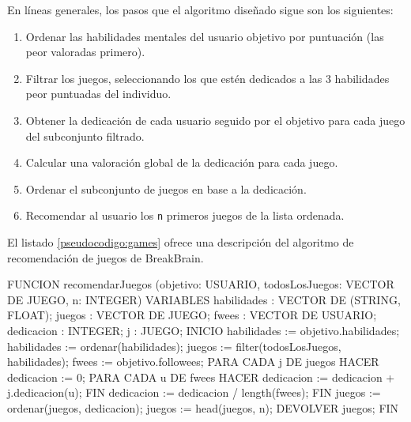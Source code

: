 En líneas generales, los pasos que el algoritmo diseñado sigue son los siguientes:

\begin{enumerate}
\item Ordenar las habilidades mentales del usuario objetivo por puntuación (las peor valoradas primero).
\item Filtrar los juegos, seleccionando los que estén dedicados a las 3 habilidades peor puntuadas del individuo.
\item Obtener la dedicación de cada usuario seguido por el objetivo para cada juego del subconjunto filtrado.
\item Calcular una valoración global de la dedicación para cada juego.
\item Ordenar el subconjunto de juegos en base a la dedicación.
\item Recomendar al usuario los {\tt n} primeros juegos de la lista ordenada.
\end{enumerate}

El listado \ref{pseudocodigo:games} ofrece una descripción del algoritmo de recomendación de juegos de BreakBrain.

\begin{listing}[caption=Algoritmo de recomendación de juegos, label=pseudocodigo:games]
FUNCION recomendarJuegos (objetivo: USUARIO, todosLosJuegos: VECTOR DE JUEGO, n: INTEGER)
VARIABLES
    habilidades : VECTOR DE (STRING, FLOAT);
    juegos : VECTOR DE JUEGO;
    fwees : VECTOR DE USUARIO;
    dedicacion : INTEGER;
    j : JUEGO;
INICIO
    habilidades := objetivo.habilidades;
    habilidades := ordenar(habilidades);
    juegos := filter(todosLosJuegos, habilidades);
    fwees := objetivo.followees;
    PARA CADA j DE juegos HACER
        dedicacion := 0;
        PARA CADA u DE fwees HACER
            dedicacion := dedicacion + j.dedicacion(u);
        FIN
        dedicacion := dedicacion / length(fwees);
    FIN
    juegos := ordenar(juegos, dedicacion);
    juegos := head(juegos, n);
    DEVOLVER juegos;
FIN
\end{listing}





